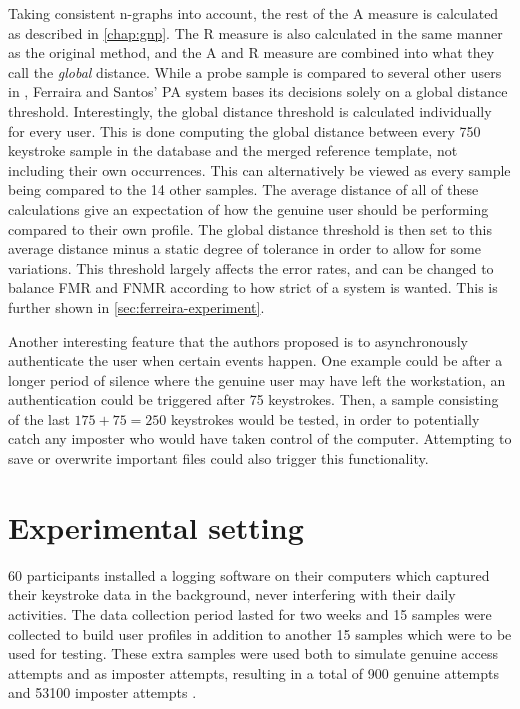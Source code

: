 \documentclass[informationsecurity]{gucmasterproject}
\begin{document}
Taking consistent n-graphs into account, the rest of the A measure is calculated as described in \autoref{chap:gnp}. The R measure is also calculated in the same manner as the original method, and the A and R measure are combined into what they call the \textit{global} distance.
While a probe sample is compared to several other users in \cite{gnp, Messerman}, Ferraira and Santos' PA system bases its decisions solely on a global distance threshold.
Interestingly, the global distance threshold is calculated individually for every user.
This is done computing the global distance between every 750 keystroke sample in the database and the merged reference template, not including their own occurrences.
This can alternatively be viewed as every sample being compared to the 14 other samples.
The average distance of all of these calculations give an expectation of how the genuine user should be performing compared to their own profile.
The global distance threshold is then set to this average distance minus a static degree of tolerance in order to allow for some variations.
This threshold largely affects the error rates, and can be changed to balance FMR and FNMR according to how strict of a system is wanted.
This is further shown in \autoref{sec:ferreira-experiment}.

Another interesting feature that the authors proposed is to asynchronously authenticate the user when certain events happen.
One example could be after a longer period of silence where the genuine user may have left the workstation, an authentication could be triggered after 75 keystrokes.
Then, a sample consisting of the last $175 + 75 = 250$ keystrokes would be tested, in order to potentially catch any imposter who would have taken control of the computer.
Attempting to save or overwrite important files could also trigger this functionality.

\section{Experimental setting}
\label{sec:ferreira-experiment}
60 participants installed a logging software on their computers which captured their keystroke data in the background, never interfering with their daily activities.
The data collection period lasted for two weeks and 15 samples were collected to build user profiles in addition to another 15 samples which were to be used for testing.
These extra samples were used both to simulate genuine access attempts and as imposter attempts, resulting in a total of 900 genuine attempts and 53100 imposter attempts \cite{superResults}.
\end{document}
